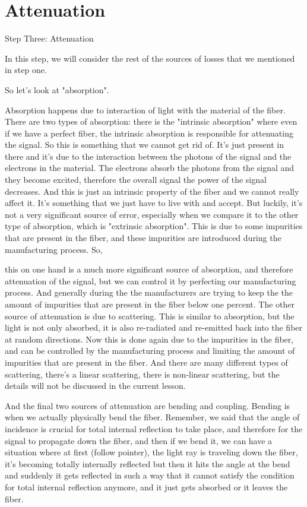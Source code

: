 \section{Attenuation}

Step Three: Attenuation

In this step, we will consider the rest of the sources of losses that we mentioned in step one.

So let's look at "absorption".

Absorption happens due to interaction of light with the material of the fiber. There are two types of absorption: there is the "intrinsic absorption" where even if we have a perfect fiber, the intrinsic absorption is responsible for attenuating the signal. So this is something that we cannot get rid of. It's just present in there and it's due to the interaction between the photons of the signal and the electrons in the material. The electrons absorb the photons from the signal and they become excited, therefore the overall signal the power of the signal decreases. And this is just an intrinsic property of the fiber and we cannot really affect it. It's something that we just have to live with and accept. But luckily, it's not a very significant source of error, especially when we compare it to the other type of absorption, which is "extrinsic absorption". This is due to some impurities that are present in the fiber, and these impurities are introduced during the manufacturing process. So,

this on one hand is a much more significant source of absorption, and therefore attenuation of the signal, but we can control it by perfecting our manufacturing process. And generally during the the manufacturers are trying to keep the the amount of impurities that are present in the fiber below one percent. The other source of attenuation is due to scattering. This is similar to absorption, but the light is not only absorbed, it is also re-radiated and re-emitted back into the fiber at random directions. Now this is done again due to the impurities in the fiber, and can be controlled by the manufacturing process and limiting the amount of impurities that are present in the fiber. And there are many different types of scattering, there's a linear scattering, there is non-linear scattering, but the details will not be discussed in the current lesson.

And the final two sources of attenuation are bending and coupling. Bending is when we actually physically bend the fiber. Remember, we said that the angle of incidence is crucial for total internal reflection to take place, and therefore for the signal to propagate down the fiber, and then if we bend it, we can have a situation where at first (follow pointer), the light ray is traveling down the fiber, it's becoming totally internally reflected but then it hits the angle at the bend and suddenly it gets reflected in such a way that it cannot satisfy the condition for total internal reflection anymore, and it just gets absorbed or it leaves the fiber.

